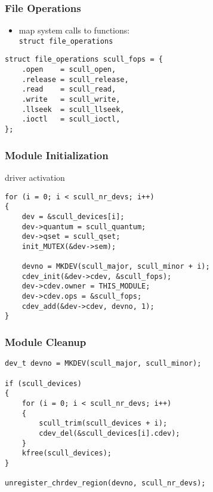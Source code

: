 \documentclass[dvipsnames]{beamer}
\begin{document}
\begin{frame}[fragile]
  \frametitle{File Operations}

  \begin{itemize}
    \item map system calls to functions:\\
      \lstinline|struct file_operations|
  \end{itemize}

  \begin{exampleblock}{}
    \begin{lstlisting}
struct file_operations scull_fops = {
    .open    = scull_open,
    .release = scull_release,
    .read    = scull_read,
    .write   = scull_write,
    .llseek  = scull_llseek,
    .ioctl   = scull_ioctl,
};
    \end{lstlisting}
  \end{exampleblock}
\end{frame}

\begin{frame}[fragile]
  \frametitle{Module Initialization}

  \begin{exampleblock}{driver activation}
    \begin{lstlisting}
for (i = 0; i < scull_nr_devs; i++)
{
    dev = &scull_devices[i];
    dev->quantum = scull_quantum;
    dev->qset = scull_qset;
    init_MUTEX(&dev->sem);

    devno = MKDEV(scull_major, scull_minor + i);
    cdev_init(&dev->cdev, &scull_fops);
    dev->cdev.owner = THIS_MODULE;
    dev->cdev.ops = &scull_fops;
    cdev_add(&dev->cdev, devno, 1);
}
    \end{lstlisting}
  \end{exampleblock}
\end{frame}

\begin{frame}[fragile]
  \frametitle{Module Cleanup}

  \begin{exampleblock}{}
    \begin{lstlisting}
dev_t devno = MKDEV(scull_major, scull_minor);

if (scull_devices)
{
    for (i = 0; i < scull_nr_devs; i++)
    {
        scull_trim(scull_devices + i);
        cdev_del(&scull_devices[i].cdev);
    }
    kfree(scull_devices);
}

unregister_chrdev_region(devno, scull_nr_devs);
    \end{lstlisting}
  \end{exampleblock}
\end{frame}
\end{document}
